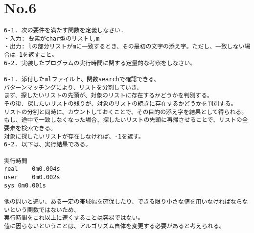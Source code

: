 \documentclass{jarticle}
\begin{document}
\section{No.6}
\begin{verbatim}
6-1. 次の要件を満たす関数を定義しなさい.
・入力: 要素がchar型のリストl,m
・出力: lの部分リストがmに一致するとき、その最初の文字の添え字。ただし、一致しない場合は-1を返すこと。
6-2. 実装したプログラムの実行時間に関する定量的な考察をしなさい。

6-1. 添付したmlファイル上、関数searchで確認できる。
パターンマッチングにより、リストを分割していき、
まず、探したいリストの先頭が、対象のリストに存在するかどうかを判別する。
その後、探したいリストの残りが、対象のリストの続きに存在するかどうかを判別する。
リストの分割と同時に、カウントしておくことで、その目的の添え字を結果として得られる。
もし、途中で一致しなくなった場合、探したいリストの先頭に再帰させることで、リストの全要素を検索できる。
対象に探したいリストが存在しなければ、-1を返す。
6-2. 以下は、実行結果である。

実行時間
real	0m0.004s
user	0m0.002s
sys	0m0.001s

他の問いと違い、ある一定の帯域幅を確保したり、できる限り小さな値を用いなければならないという関数ではないため、
実行時間をこれ以上に速くすることは容易ではない。
値に因らないということは、アルゴリズム自体を変更する必要があると考えられる。
\end{verbatim}
\end{document}
